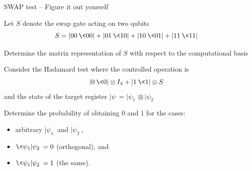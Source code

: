 \begin{frame}{SWAP test -- Figure it out yourself}

Let $S$ denote the swap gate acting on two qubits
\[
S = |00\>\<00| + |01\>\<10| + |10\>\<01| + |11\>\<11|
\]

\bigskip
Determine the matrix representation of $S$ with respect to the computational basis

\bigskip
Consider the Hadamard test where the controlled operation is
\[
|0\>\<0|\otimes I_4 + |1\>\<1| \otimes S
\]
and the state of the target register $|\psi\>=|\psi_1\>\otimes |\psi_2\>$

\bigskip
Determine the probability of obtaining $0$ and $1$ for the cases:
\begin{itemize}
\item arbitrary $|\psi_1\>$ and $|\psi_2\>$, 
\item $\<\psi_1|\psi_2\>=0$ (orthogonal), and 
\item $\<\psi_1|\psi_2\>=1$ (the same).
\end{itemize}
\end{frame}

